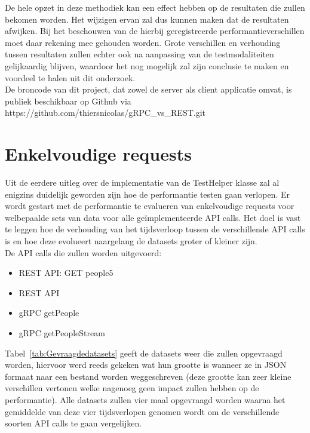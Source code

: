 De hele opzet in deze methodiek kan een effect hebben op de resultaten die zullen bekomen worden. Het wijzigen ervan zal dus kunnen maken dat de resultaten afwijken.
Bij het beschouwen van de hierbij geregistreerde performantieverschillen moet daar rekening mee gehouden worden. Grote verschillen en verhouding tussen resultaten zullen echter
ook na aanpassing van de testmodaliteiten gelijkaardig blijven, waardoor het nog mogelijk zal zijn conclusie te maken en voordeel te halen uit dit onderzoek.\\

De broncode van dit project, dat zowel de server als client applicatie omvat, is publiek beschikbaar op Github via https://github.com/thiersnicolas/gRPC\_vs\_REST.git

\section{Enkelvoudige requests}
\label{enkelvoudigerequestsmethodologie}

Uit de eerdere uitleg over de implementatie van de TestHelper klasse zal al enigzins duidelijk geworden zijn hoe de performantie testen gaan verlopen.
Er wordt gestart met de performantie te evalueren van enkelvoudige requests voor welbepaalde sets van data voor alle geïmplementeerde API calls.
Het doel is vast te leggen hoe de verhouding van het tijdsverloop tussen de verschillende API calls is en hoe deze evolueert naargelang de
datasets groter of kleiner zijn.\\

De API calls die zullen worden uitgevoerd:
\begin{itemize}
    \item REST API: GET people5
    \item REST API
    \item gRPC getPeople
    \item gRPC getPeopleStream
\end{itemize}

Tabel~\ref{tab:Gevraagdedatasets} geeft de datasets weer die zullen opgevraagd worden, hiervoor werd reeds gekeken wat hun grootte is
wanneer ze in JSON formaat naar een bestand worden weggeschreven (deze grootte kan zeer kleine verschillen vertonen welke nagenoeg geen impact zullen hebben op de performantie).
Alle datasets zullen vier maal opgevraagd worden waarna het gemiddelde van deze vier tijdsverlopen genomen wordt om de verschillende soorten API calls te gaan vergelijken.\\

